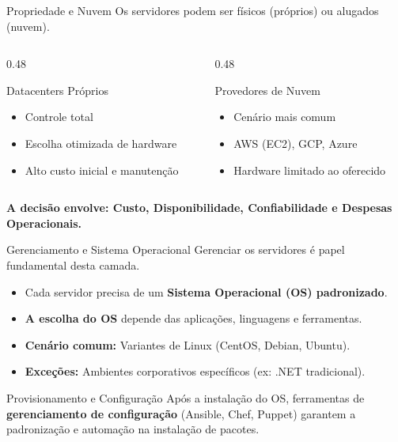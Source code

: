 \documentclass[aspectratio=169]{beamer}
\begin{document}
\begin{frame}{Propriedade e Nuvem}
    Os servidores podem ser físicos (próprios) ou alugados (nuvem).
    \vspace{0.4cm}
    \begin{columns}
        \begin{column}{0.48\textwidth}
            \begin{block}{Datacenters Próprios}
                \begin{itemize}
                    \item Controle total
                    \item Escolha otimizada de hardware
                    \item Alto custo inicial e manutenção
                \end{itemize}
            \end{block}
        \end{column}
        \begin{column}{0.48\textwidth}
            \begin{block}{Provedores de Nuvem}
                \begin{itemize}
                    \item Cenário mais comum
                    \item AWS (EC2), GCP, Azure
                    \item Hardware limitado ao oferecido
                \end{itemize}
            \end{block}
        \end{column}
    \end{columns}
    \vspace{0.4cm}
    \centering
    \textcolor{meuazul}{\textbf{A decisão envolve: Custo, Disponibilidade, Confiabilidade e Despesas Operacionais.}}
\end{frame}

\begin{frame}{Gerenciamento e Sistema Operacional}
    Gerenciar os servidores é papel fundamental desta camada.
    \vspace{0.3cm}
    \begin{itemize}
        \item Cada servidor precisa de um \textbf{Sistema Operacional (OS) padronizado}.
        \item \textbf{A escolha do OS} depende das aplicações, linguagens e ferramentas.
        \item \textbf{Cenário comum:} Variantes de Linux (CentOS, Debian, Ubuntu).
        \item \textbf{Exceções:} Ambientes corporativos específicos (ex: .NET tradicional).
    \end{itemize}
    \vspace{0.3cm}
    \begin{alertblock}{Provisionamento e Configuração}
        Após a instalação do OS, ferramentas de \textbf{gerenciamento de configuração} (Ansible, Chef, Puppet) garantem a padronização e automação na instalação de pacotes.
    \end{alertblock}
\end{frame}
\end{document}
